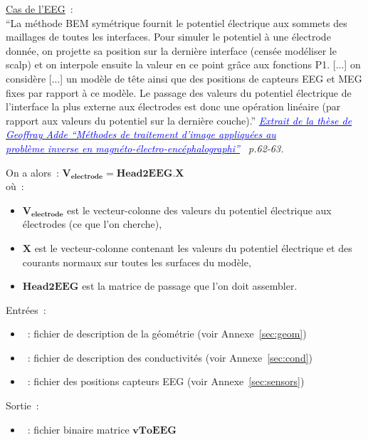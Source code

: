 \checkItem \underline{Cas de l'EEG}~:\\
``La méthode BEM symétrique fournit le potentiel électrique aux sommets des maillages de toutes les interfaces. Pour simuler le
potentiel à une électrode donnée, on projette sa position sur la dernière interface (censée modéliser le scalp) et on interpole
ensuite la valeur en ce point grâce aux fonctions P1.  [...] on considère [...] un modèle de tête ainsi que des positions de
capteurs EEG et MEG fixes par rapport à ce modèle. Le passage des valeurs du potentiel électrique de l'interface la plus externe
aux électrodes est donc une opération linéaire (par rapport aux valeurs du potentiel sur la dernière couche).''
\emph{\underline{\textcolor{blue}{Extrait de la thèse de Geoffray Adde ``Méthodes de traitement d'image appliquées au}}}\\
\emph{\underline{\textcolor{blue}{problème inverse en magnéto-électro-encéphalographi''}}  p.62-63.}

\medskip

\noindent
On a alors~: $\mathbf{V_{electrode}} = \mathbf{Head2EEG} . \mathbf{X}$\\
où~:\\ 
\begin{itemize}
    \item $\mathbf{V_{electrode}}$ est le vecteur-colonne des valeurs du potentiel électrique aux électrodes (ce que l'on cherche),
    \item $\mathbf{X}$ est le vecteur-colonne contenant les valeurs du potentiel électrique et des courants normaux sur toutes les surfaces du modèle,
    \item $\mathbf{Head2EEG}$ est la matrice de passage que l'on doit assembler.
\end{itemize}

\bigskip

\noindent
Entrées~:
\begin{itemize}
    \item {}~: fichier de description de la géométrie (voir Annexe~\ref{sec:geom})
    \item {}~: fichier de description des conductivités (voir Annexe~\ref{sec:cond})
    \item {}~: fichier des positions capteurs EEG (voir Annexe~\ref{sec:sensors})
\end{itemize}
Sortie~:
\begin{itemize}
    \item {}~: fichier binaire matrice $\mathbf{vToEEG}$
\end{itemize}

